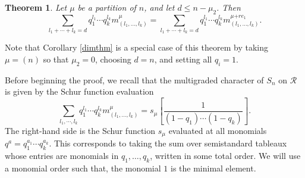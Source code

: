 \documentclass[12pt]{article}%
\newtheorem{theorem}{Theorem}
\begin{document}
\begin{theorem}
\label{multigradedthm} Let $\mu$ be a partition of $n$, and let $d \leq n-
\mu_{2}$. Then
\[
\sum_{l_{1}+\cdots+l_{k}= d } q_{1}^{l_{1}} \cdots q_{k}^{l_{k}} m^{\mu
}_{(l_{1},\dots,l_{k})} = \sum_{l_{1}+\cdots+l_{k}= d} q_{1}^{l_{1}} \cdots
q_{k}^{l_{k}} m^{\mu{+ r e_{1}} }_{(l_{1},\dots,l_{k})}.
\]

\end{theorem}
Note that Corollary \ref{dimthm} is a special case of this theorem by taking
$\mu=(n)$ so that $\mu_{2}=0$, choosing $d=n$, and setting all $q_{i}=1$.

Before beginning the proof, we recall that the multigraded character of
$S_{n}$ on $\mathcal{R}$ is given by the Schur function evaluation
\[
\sum_{l_{1},\cdots,l_{k}}q_{1}^{l_{1}}\cdots q_{k}^{l_{k}}m_{(l_{1}%
,\dots,l_{k})}^{\mu}=s_{\mu}\left[  \frac{1}{(1-q_{1})\cdots(1-q_{k})}\right]
.
\]
The right-hand side is the Schur function $s_{\mu}$ evaluated at all monomials
$q^{a}=q_{1}^{a_{1}}\cdots q_{k}^{a_{k}}$. This corresponds to taking the sum
over semistandard tableaux whose entries are monomials in $q_{1},\dots,q_{k}$,
written in some total order. We will use a monomial order such that, the
monomial $1$ is the minimal element.
\end{document}
